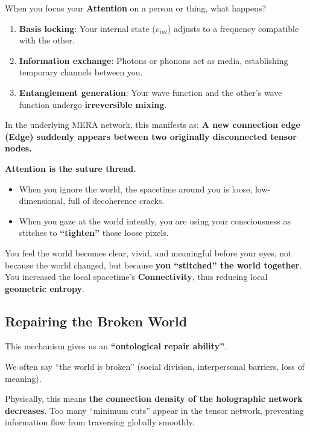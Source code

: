 When you focus your \textbf{Attention} on a person or thing, what happens?

\begin{enumerate}
\item \textbf{Basis locking}: Your internal state ($v_{int}$) adjusts to a frequency compatible with the other.

\item \textbf{Information exchange}: Photons or phonons act as media, establishing temporary channels between you.

\item \textbf{Entanglement generation}: Your wave function and the other's wave function undergo \textbf{irreversible mixing}.
\end{enumerate}

In the underlying MERA network, this manifests as: \textbf{A new connection edge (Edge) suddenly appears between two originally disconnected tensor nodes.}

\textbf{Attention is the suture thread.}

\begin{itemize}
\item When you ignore the world, the spacetime around you is loose, low-dimensional, full of decoherence cracks.

\item When you gaze at the world intently, you are using your consciousness as stitches to \textbf{``tighten''} those loose pixels.
\end{itemize}

You feel the world becomes clear, vivid, and meaningful before your eyes, not because the world changed, but because \textbf{you ``stitched'' the world together}. You increased the local spacetime's \textbf{Connectivity}, thus reducing local \textbf{geometric entropy}.

\subsection{Repairing the Broken World}

This mechanism gives us an \textbf{``ontological repair ability''}.

We often say ``the world is broken'' (social division, interpersonal barriers, loss of meaning).

Physically, this means \textbf{the connection density of the holographic network decreases}. Too many ``minimum cuts'' appear in the tensor network, preventing information flow from traversing globally smoothly.

